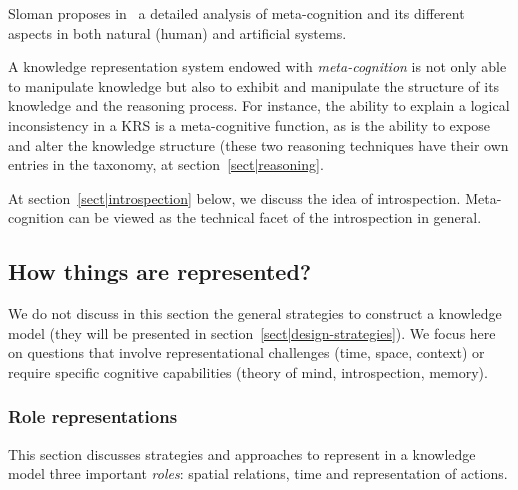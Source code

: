 \documentclass[a4paper, twocolumn]{article}
\begin{document}
Sloman proposes in~\cite{Sloman2011} a detailed analysis of meta-cognition and
its different aspects in both natural (human) and artificial systems.

A knowledge representation system endowed with \emph{meta-cognition} is not
only able to manipulate knowledge but also to exhibit and manipulate the
structure of its knowledge and the reasoning process. For instance, the ability
to explain a logical inconsistency in a KRS is a meta-cognitive function, as is
the ability to expose and alter the knowledge structure (these two reasoning
techniques have their own entries in the taxonomy, at
section~\ref{sect|reasoning}.

At section~\ref{sect|introspection} below, we discuss the idea of
introspection.  Meta-cognition can be viewed as the technical facet of the
introspection in general.


\subsection{How things are represented?}
\label{sect|higher-level-domain-representation}

We do not discuss in this section the general strategies to construct a
knowledge model (they will be presented in
section~\ref{sect|design-strategies}). We focus here on questions that involve
representational challenges (time, space, context) or require specific
cognitive capabilities (theory of mind, introspection, memory).

\begin{scriptsize}
\begin{center}
\end{center}
\end{scriptsize}

\subsubsection{Role representations}

This section discusses strategies and approaches to represent in a knowledge
model three important \emph{roles}: spatial relations, time and representation
of actions.
\end{document}
